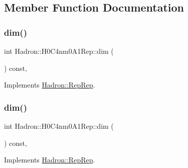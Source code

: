 \subsection{Member Function Documentation}
\mbox{\label{structHadron_1_1H0C4nm0A1Rep_a75a9237739a48786d90912cccfa9639e}} 
\subsubsection{\texorpdfstring{dim()}{dim()}\hspace{0.1cm}{\footnotesize\ttfamily [1/5]}}
{\footnotesize\ttfamily int Hadron\+::\+H0\+C4nm0\+A1\+Rep\+::dim (\begin{DoxyParamCaption}{ }\end{DoxyParamCaption}) const\hspace{0.3cm}{\ttfamily [inline]}, {\ttfamily [virtual]}}



Implements \mbox{\hyperlink{structHadron_1_1RepRep_a92c8802e5ed7afd7da43ccfd5b7cd92b}{Hadron\+::\+Rep\+Rep}}.

\mbox{\label{structHadron_1_1H0C4nm0A1Rep_a75a9237739a48786d90912cccfa9639e}} 
\subsubsection{\texorpdfstring{dim()}{dim()}\hspace{0.1cm}{\footnotesize\ttfamily [2/5]}}
{\footnotesize\ttfamily int Hadron\+::\+H0\+C4nm0\+A1\+Rep\+::dim (\begin{DoxyParamCaption}{ }\end{DoxyParamCaption}) const\hspace{0.3cm}{\ttfamily [inline]}, {\ttfamily [virtual]}}



Implements \mbox{\hyperlink{structHadron_1_1RepRep_a92c8802e5ed7afd7da43ccfd5b7cd92b}{Hadron\+::\+Rep\+Rep}}.

\mbox{\label{structHadron_1_1H0C4nm0A1Rep_a75a9237739a48786d90912cccfa9639e}} 

